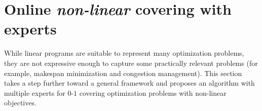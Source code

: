 
\section{Online \emph{non-linear} covering with experts} \label{sec:convex}

While linear programs are suitable to represent many optimization problems, they are not expressive enough to capture some practically relevant problems (for example, makespan minimization and congestion management). This section takes a step further toward a general framework and proposes an algorithm with multiple experts for $0$-$1$ covering optimization problems with non-linear objectives.



